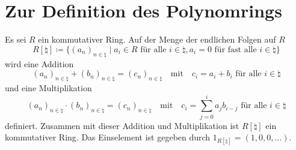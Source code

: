 \section{Zur Definition des Polynomrings}

Es sei $R$ ein kommutativer Ring.
Auf der Menge der endlichen Folgen auf $R$
\begin{equation}
  \tag{D}
  \label{equation: definition}
  R[\natural]
  \coloneqq
  \{
    (a_n)_{n \in \natural}
  \mid
    \text{$a_i \in R$ für alle $i \in \natural$},
    \text{$a_i = 0$ für fast alle $i \in \natural$} 
  \}
\end{equation}
wird eine Addition
\begin{equation}
  \tag{A}
  \label{equation: addition}
    (a_n)_{n \in \natural} + (b_n)_{n \in \natural}
  = (c_n)_{n \in \natural}
  \quad\text{mit}\quad
  \text{$c_i = a_i + b_i$ für alle $i \in \natural$}
\end{equation}
und eine Multiplikation
\begin{equation}
  \tag{M}
  \label{equation: multiplication}
    (a_n)_{n \in \natural} \cdot (b_n)_{n \in \natural}
  = (c_n)_{n \in \natural}
  \quad\text{mit}\quad
  \text{$c_i = \sum_{j=0}^i a_j b_{i-j}$ für alle $i \in \natural$}
\end{equation}
definiert.
Zusammen mit dieser Addition und Multiplikation ist $R[\natural]$ ein kommutativer Ring.
Das Einselement ist gegeben durch $1_{R[\natural]} = (1, 0, 0, \dotsc)$.

